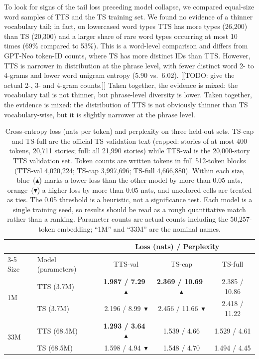 \documentclass{article}
\newcommand{\win}[1]{\cellcolor{winblue}\textbf{#1}~$\blacktriangle$}
\newcommand{\lose}[1]{\cellcolor{lossorange}#1~$\blacktriangledown$}
\newif\ifmarkup
\DeclareRobustCommand{\ins}[1]{\ifmarkup\textbf{#1}\else#1\fi}
\begin{document}
To look for signs of the tail loss preceding model collapse, we compared equal-size word samples of TTS and the TS training set. We found no evidence of a thinner vocabulary tail; in fact, on lowercased word types TTS has more types (26,200) than TS (20,300) and a larger share of rare word types occurring at most 10 times (69\% compared to 53\%). This is a word-level comparison and differs from GPT-Neo token-ID counts, where TS has more distinct IDs than TTS. However, TTS is narrower in distribution at the phrase level, with fewer distinct word 2- to 4-grams and lower word unigram entropy (5.90 vs.\ 6.02). \ins{[[TODO: give the actual 2-, 3- and 4-gram counts.]] Taken together, the evidence is mixed: the vocabulary tail is not thinner, but phrase-level diversity is lower.} Taken together, the evidence is mixed: the distribution of TTS is not obviously thinner than TS vocabulary-wise, but it is slightly narrower at the phrase level.

\begin{table}[H]
  \centering
  \small
  \begin{tabular}{@{}llccc@{}}
    \toprule
    & & \multicolumn{3}{c}{Loss (nats) / Perplexity} \\
    \cmidrule(lr){3-5}
    Size & Model (parameters) & TTS-val & TS-cap & TS-full \\
    \midrule
    \multirow{2}{*}{1M}
      & TTS (3.7M)      & \win{1.987 / 7.29} & \win{2.369 / 10.69} & 2.385 / 10.86 \\
      & TS (3.7M)  & \lose{\ins{2.196 / 8.99}} & \lose{\ins{2.456 / 11.66}}       & 2.418 / 11.22 \\
    \midrule
    \multirow{2}{*}{33M}
      & TTS (68.5M)     & \win{1.293 / 3.64} & 1.539 / 4.66        & 1.529 / 4.61 \\
      & TS (68.5M)  & \lose{\ins{1.598 / 4.94}} & 1.548 / 4.70        & 1.494 / 4.45 \\
    \bottomrule
  \end{tabular}
  \caption{Cross-entropy loss (nats per token) and perplexity on three
  held-out sets. TS-cap and TS-full are the official TS validation text
  (capped: stories of at most 400 tokens, 20,711 stories; full: all 21,990 stories) while TTS-val is the 20,000-story TTS validation set. Token counts are written tokens in full 512-token blocks (TTS-val 4,020,224; TS-cap 3,997,696; TS-full 4,666,880).
  Within each size, blue~($\blacktriangle$) marks a lower loss than the
  other model by more than 0.05 nats, orange~($\blacktriangledown$) a
  higher loss by more than 0.05 nats, and uncolored cells are treated as
  ties. The 0.05 threshold is a heuristic, not a
  significance test. Each model is a single training seed, so results
  should be read as a rough quantitative match rather than a ranking.
  Parameter counts are actual counts including the 50,257-token
  embedding; ``1M'' and ``33M'' are the nominal names.}
  \label{tab:loss}
\end{table}
\end{document}
